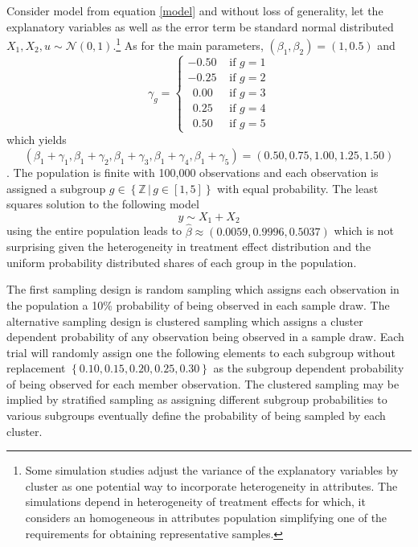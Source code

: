 \documentclass{jbsc}
\begin{document}
Consider model from equation \ref{model} and without loss of generality, let the explanatory variables as well as the error term be standard normal distributed $X_{1}, X_{2}, u \sim \mathcal{N}\left(0,1\right)$.\footnote{Some simulation studies adjust the variance of the explanatory variables by cluster as one potential way to incorporate heterogeneity in attributes. The simulations depend in heterogeneity of treatment effects for which, it considers an homogeneous in attributes population simplifying one of the requirements for obtaining representative samples.} As for the main parameters, $\left(\beta_{1}, \beta_{2}\right) = \left(1, 0.5\right)$ and
\begin{equation}
\gamma_{g} =
\begin{cases}
- 0.50 & \text{ if } g = 1\\
- 0.25 & \text{ if } g = 2\\
\ \ 0.00 & \text{ if } g = 3\\
\ \ 0.25 & \text{ if } g = 4\\
\ \ 0.50 & \text{ if } g = 5
\end{cases}
\end{equation}
which yields
\begin{equation*}
    \left(\beta_{1} + \gamma_{1}, \beta_{1} + \gamma_{2}, \beta_{1} + \gamma_{3}, \beta_{1} + \gamma_{4}, \beta_{1} + \gamma_{5}\right) = \left(0.50, 0.75, 1.00, 1.25, 1.50\right)
\end{equation*}.
The population is finite with 100,000 observations and each observation is assigned a subgroup $g \in \left\{\mathbb{Z}\,|\,g \in [1, 5]\right\}$ with equal probability. The least squares solution to the following model
\begin{equation}
\label{naiveformula}
y \sim X_{1} + X_{2}
\end{equation}
using the entire population leads to $\hat{\beta} \approx \left(0.0059, 0.9996, 0.5037\right)$ which is not surprising given the heterogeneity in treatment effect distribution and the uniform probability distributed shares of each group in the population.

The first sampling design is random sampling which assigns each observation in the population a 10\% probability of being observed in each sample draw. The alternative sampling design is clustered sampling which assigns a cluster dependent probability of any observation being observed in a sample draw. Each trial will randomly assign one the following elements to each subgroup without replacement $\left\{0.10, 0.15, 0.20, 0.25, 0.30\right\}$ as the subgroup dependent probability of being observed for each member observation. The clustered sampling may be implied by stratified sampling as assigning different subgroup probabilities to various subgroups eventually define the probability of being sampled by each cluster.
\end{document}
